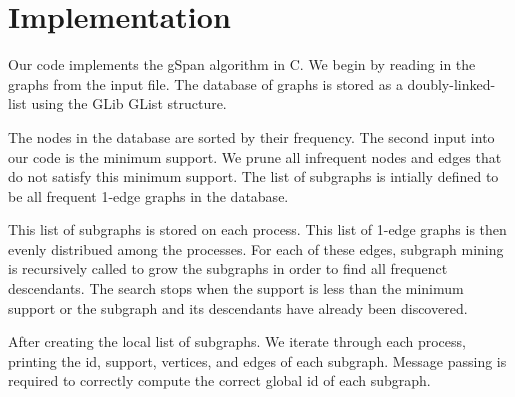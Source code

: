 \section{Implementation}
\label{sec:implementation}

Our code implements the gSpan algorithm in C. We begin by reading in
the graphs from the input file. The database of graphs is
stored as a doubly-linked-list using the GLib GList structure.

The nodes in the database are sorted by their frequency. The second input
into our code is the minimum support. We prune all infrequent nodes and
edges that do not satisfy this minimum support. The list of subgraphs is
intially defined to be all frequent 1-edge graphs in the database. 

This list of subgraphs is stored on each process. This list of 1-edge graphs
is then evenly distribued among the processes. For each of these edges,
subgraph mining is recursively called to grow the subgraphs in order to find
all frequenct descendants. The search stops when the support is less than the
minimum support or the subgraph and its descendants have already been
discovered.

After creating the local list of subgraphs. We iterate through each process,
printing the id, support, vertices, and edges of each subgraph.
Message passing is required to correctly compute the correct global 
id of each subgraph.
